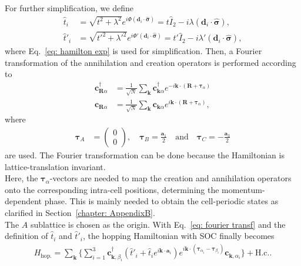 For further simplification, we define 
\begin{align}
    \hat{t}_i &= \sqrt{t^2 + \lambda^2}e^{i\Phi (\mathbf{d}_i\cdot \bm{\hat{\sigma}})} = t \hat{I}_2 - i \lambda(\mathbf{d}_i \cdot \bm{\hat{\sigma}}), \nonumber \\
    \hat{t}'_i &= \sqrt{t'^2 + \lambda'^2}e^{i\Phi' (\mathbf{d}_i\cdot \bm{\hat{\sigma}})} = t' \hat{I}_2 - i \lambda'(\mathbf{d}_i \cdot \bm{\hat{\sigma}}),
    \label{eq: t_hat and t_prime_hat}
\end{align}
where Eq.~\eqref{eq: hamilton exp} is used for simplification. Then, a Fourier transformation of the annihilation and creation operators is performed according to 
\begin{align}
     \mathbf{c}^{\dagger}_{\mathbf{R}\alpha} &= \frac{1}{\sqrt{N}} \sum_{\mathbf{k}} \mathbf{c}^{\dagger}_{\mathbf{k}\alpha} e^{-i \mathbf{k} \cdot (\mathbf{R}+\bm{\tau}_\alpha)} \nonumber\\
       \mathbf{c}_{\mathbf{R}\alpha} &= \frac{1}{\sqrt{N}} \sum_{\mathbf{k}} \mathbf{c}_{\mathbf{k}\alpha} e^{i \mathbf{k} \cdot (\mathbf{R}+\bm{\tau}_\alpha)},
    \label{eq: fourier transf}
\end{align}
where 
\begin{align}
           \bm{\tau}_A &= \begin{pmatrix}
           0 \\ 0
       \end{pmatrix}, \quad  \bm{\tau}_B = \frac{\mathbf{a}_1}{2} \quad \text{and} \quad  \bm{\tau}_C = -\frac{\mathbf{a}_3}{2}
\end{align} 
are used. The Fourier transformation can be done because the Hamiltonian is lattice-translation invariant. \\
Here, the $\bm{\tau}_\alpha$-vectors are needed to map the creation and annihilation operators onto the corresponding intra-cell positions, determining the momentum-dependent phase. This is mainly needed to obtain the cell-periodic states as clarified in Section~\ref{chapter: AppendixB}. \\
The $A$ sublattice is chosen as the origin. With Eq.~\eqref{eq: fourier transf} and the definition of $\hat{t}_i$ and $\hat{t}'_i$, the hopping Hamiltonian with SOC finally becomes
 \begin{align}
     H_\text{hop.} =  \sum_{\mathbf{k}}\Bigg\{ \sum_{i=1}^3 \mathbf{c}_{\mathbf{k},\beta_i}^\dagger (\hat{t}'_i + \hat{t}_i e^{i\mathbf{k}\cdot \mathbf{a}_i}) e^{i\mathbf{k}\cdot(\bm{\tau}_{\alpha_i} - \bm{\tau}_{\beta_i})} \mathbf{c}_{\mathbf{k},\alpha_i} \Bigg\}+\text{H.c.}.
 \end{align}
